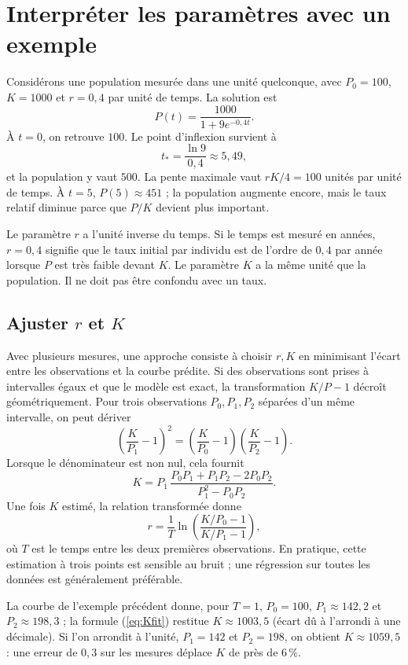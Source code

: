\section{Interpréter les paramètres avec un exemple}
Considérons une population mesurée dans une unité quelconque, avec $P_0=100$, $K=1000$ et $r=0{,}4$ par unité de temps. La solution est
\[
 P(t)=\frac{1000}{1+9e^{-0{,}4t}}.
\]
À $t=0$, on retrouve $100$. Le point d'inflexion survient à
\[
 t_* = \frac{\ln 9}{0{,}4}\approx5{,}49,
\]
et la population y vaut $500$. La pente maximale vaut $rK/4=100$ unités par unité de temps. À $t=5$, $P(5)\approx451$ ; la population augmente encore, mais le taux relatif diminue parce que $P/K$ devient plus important.

Le paramètre $r$ a l'unité inverse du temps. Si le temps est mesuré en années, $r=0{,}4$ signifie que le taux initial par individu est de l'ordre de $0{,}4$ par année lorsque $P$ est très faible devant $K$. Le paramètre $K$ a la même unité que la population. Il ne doit pas être confondu avec un taux.

\subsection{Ajuster \texorpdfstring{$r$}{r} et \texorpdfstring{$K$}{K}}
Avec plusieurs mesures, une approche consiste à choisir $r,K$ en minimisant l'écart entre les observations et la courbe prédite. Si des observations sont prises à intervalles égaux et que le modèle est exact, la transformation $K/P-1$ décroît géométriquement. Pour trois observations $P_0,P_1,P_2$ séparées d'un même intervalle, on peut dériver
\[
 \left(\frac K{P_1}-1\right)^2=
 \left(\frac K{P_0}-1\right)\left(\frac K{P_2}-1\right).
\]
Lorsque le dénominateur est non nul, cela fournit
\begin{equation}\label{eq:Kfit}
 K=P_1\,\frac{P_0P_1+P_1P_2-2P_0P_2}{P_1^2-P_0P_2}.
\end{equation}
Une fois $K$ estimé, la relation transformée donne
\[
 r=\frac1T\ln\left(\frac{K/P_0-1}{K/P_1-1}\right),
\]
où $T$ est le temps entre les deux premières observations. En pratique, cette estimation à trois points est sensible au bruit ; une régression sur toutes les données est généralement préférable.

\begin{exemple}
La courbe de l'exemple précédent donne, pour $T=1$, $P_0=100$, $P_1\approx142{,}2$ et $P_2\approx198{,}3$ ; la formule (\ref{eq:Kfit}) restitue $K\approx1003{,}5$ (écart dû à l'arrondi à une décimale). Si l'on arrondit à l'unité, $P_1=142$ et $P_2=198$, on obtient $K\approx1059{,}5$ : une erreur de $0{,}3$ sur les mesures déplace $K$ de près de $6\,\%$.
\end{exemple}

